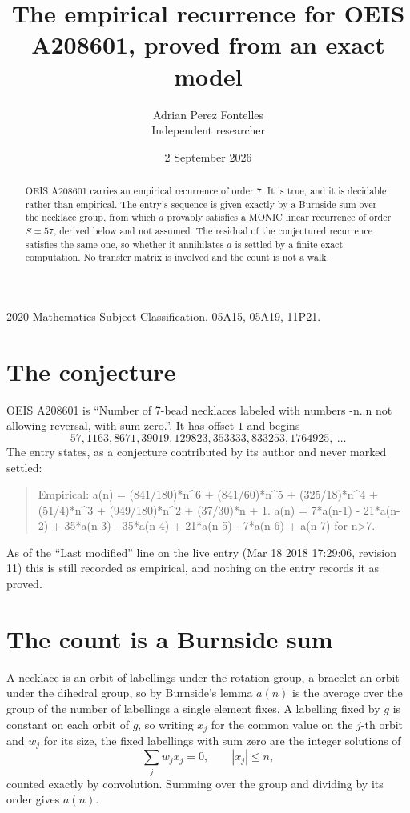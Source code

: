 \documentclass[11pt,a4paper]{article}
\title{The empirical recurrence for OEIS A208601, proved from an exact model}
\author{Adrian Perez Fontelles\\ \small Independent researcher}
\date{2 September 2026}
\theoremstyle{plain}
\theoremstyle{definition}
\begin{document}
\maketitle

\begin{abstract}
OEIS A208601 carries an empirical recurrence of order $7$. It is true, and it is
decidable rather than empirical. The entry's sequence is given exactly by a Burnside sum over the necklace group, from
which $a$ provably satisfies a MONIC linear recurrence of order $S=57$, derived below and not
assumed. The residual of the conjectured recurrence satisfies the same one, so whether it
annihilates $a$ is settled by a finite exact computation. No transfer matrix is involved and
the count is not a walk.
\end{abstract}

\noindent\small 2020 Mathematics Subject Classification. 05A15, 05A19, 11P21.\normalsize

\section{The conjecture}

OEIS A208601 is ``Number of 7-bead necklaces labeled with numbers -n..n not allowing reversal, with sum zero.''. It has offset $1$ and begins
\[
57, 1163, 8671, 39019, 129823, 353333, 833253, 1764925,\ \dots
\]
The entry states, as a conjecture contributed by its author and never marked settled:
\begin{quote}
Empirical: a(n) = (841/180)*n\^{}6 + (841/60)*n\^{}5 + (325/18)*n\^{}4 + (51/4)*n\^{}3 + (949/180)*n\^{}2 + (37/30)*n + 1. a(n) = 7*a(n-1) - 21*a(n-2) + 35*a(n-3) - 35*a(n-4) + 21*a(n-5) - 7*a(n-6) + a(n-7) for n>7.
\end{quote}
As of the ``Last modified'' line on the live entry (Mar 18 2018 17:29:06, revision 11)
this is still recorded as empirical, and nothing on the entry records it as proved.

\section{The count is a Burnside sum}

A necklace is an orbit of labellings under the rotation group, a bracelet an orbit under the
dihedral group, so by Burnside's lemma $a(n)$ is the average over the group of the number of
labellings a single element fixes. A labelling fixed by $g$ is constant on each orbit of $g$,
so writing $x_j$ for the common value on the $j$-th orbit and $w_j$ for its size, the fixed
labellings with sum zero are the integer solutions of
\[
\sum_j w_jx_j = 0,\qquad |x_j|\le n,
\]
counted exactly by convolution. Summing over the group and dividing by its order gives $a(n)$.
\end{document}
